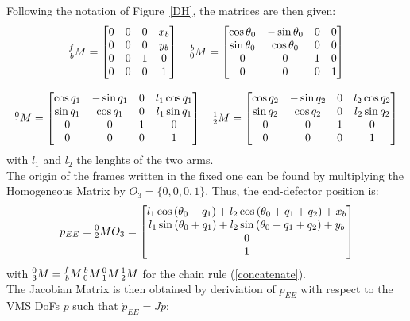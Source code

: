\documentclass[a4paper,12pt,oneside]{report}
\begin{document}
Following the notation of Figure~\ref{DH}, the matrices are then given:
\begin{equation}
  \begin{array}{c}
    \prescript{f}{b}{M}=\begin{bmatrix}
      0&0&0&x_b\\
    0&0&0&y_b\\
    0&0&1&0\\
    0&0&0&1
    \end{bmatrix}\quad
    \prescript{b}{0}{M}=\begin{bmatrix}
      \cos{\theta_0}&-\sin{\theta_0}&0&0\\
      \sin{\theta_0}&\cos{\theta_0}&0&0\\
      0&0&1&0\\
      0&0&0&1
    \end{bmatrix}\\ \\
    \prescript{0}{1}{M}=\begin{bmatrix}
      \cos{q_1}&-\sin{q_1}&0&l_1\cos{q_1}\\
      \sin{q_1}&\cos{q_1}&0&l_1\sin{q_1}\\
      0&0&1&0\\
      0&0&0&1
    \end{bmatrix}\quad
    \prescript{1}{2}{M}=\begin{bmatrix}
      \cos{q_2}&-\sin{q_2}&0&l_2\cos{q_2}\\
      \sin{q_2}&\cos{q_2}&0&l_2\sin{q_2}\\
      0&0&1&0\\
      0&0&0&1
    \end{bmatrix}
  \end{array}
\end{equation}
with $l_1$ and $l_2$ the lenghts of the two arms.\\
The origin of the frames written in the fixed one can be found by multiplying the Homogeneous Matrix by $O_3=\{0,0,0,1\}$. Thus, the end-defector position is:
\begin{equation}
  p_{EE}=\prescript{0}{2}{M}O_3= \begin{bmatrix}
    l_1\cos{(\theta_0+q_1)}+l_2\cos{(\theta_0+q_1+q_2)}+x_b\\
    l_1\sin{(\theta_0+q_1)}+l_2\sin{(\theta_0+q_1+q_2)}+y_b\\0\\1
   \end{bmatrix}
   \label{EE_position}
\end{equation}
with $\prescript{0}{3}{M}=\prescript{f}{b}{M}\prescript{b}{0}{M}\prescript{0}{1}{M}\prescript{1}{2}{M}$ for the chain rule (\ref{concatenate}).\\
The Jacobian Matrix is then obtained by deriviation of $p_{EE}$ with respect to the VMS DoFs $p$ such that $\dot{p}_{EE}=J\dot{p}$:
\end{document}
